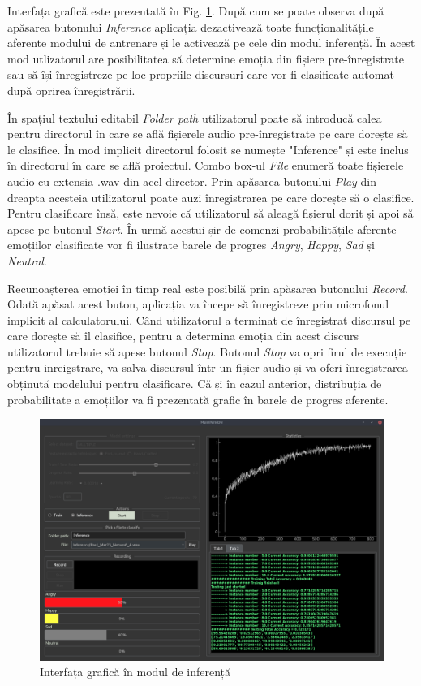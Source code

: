 \documentclass[a4paper,12pt]{book}
\begin{document}
		Interfața grafică este prezentată în Fig. \ref{fig:gui_inf}. După cum se poate observa după apăsarea butonului \textit{Inference}
		aplicația dezactivează toate funcționalitățile aferente modului de antrenare și le activează pe cele din modul inferență. În acest mod utlizatorul are posibilitatea să determine emoția din fișiere pre-înregistrate sau să își înregistreze pe loc propriile discursuri care vor fi clasificate automat după oprirea înregistrării. \par
		
		În spațiul textului editabil \textit{Folder path} utilizatorul poate să introducă calea pentru directorul în care se află fișierele audio pre-înregistrate pe care dorește să le clasifice. În mod implicit directorul folosit se numește "Inference" și este inclus în directorul în care se află proiectul. Combo box-ul \textit{File} enumeră toate fișierele audio cu extensia .wav din acel director. Prin apăsarea butonului \textit{Play} din dreapta acesteia utilizatorul poate auzi înregistrarea pe care dorește să o clasifice. Pentru clasificare însă, este nevoie că utilizatorul să aleagă fișierul dorit și apoi să apese pe butonul \textit{Start}. În urmă acestui șir de comenzi probabilitățile aferente emoțiilor clasificate vor fi ilustrate barele de progres \textit{Angry},  \textit{Happy}, \textit{Sad} și \textit{Neutral}. \par
		Recunoașterea emoției în timp real este posibilă prin apăsarea butonului \textit{Record}. Odată apăsat acest buton, aplicația va începe să înregistreze prin microfonul implicit al calculatorului. Când utilizatorul a terminat de înregistrat discursul pe care dorește să îl clasifice, pentru a determina emoția din acest discurs utilizatorul trebuie să apese butonul \textit{Stop}. Butonul \textit{Stop} va opri firul de execuție pentru inreigstrare, va salva discursul într-un fișier audio și va oferi înregistrarea obținută modelului pentru clasificare. Că și în cazul anterior, distribuția de probabilitate a emoțiilor va fi prezentată grafic în barele de progres aferente. \par
		\begin{figure}[h]
			\hspace{-0.7cm}
			\includegraphics[scale=0.40]{gui_inf}
			\caption{Interfața grafică în modul de inferență}
			\label{fig:gui_inf}
		\end{figure} 
\end{document}

